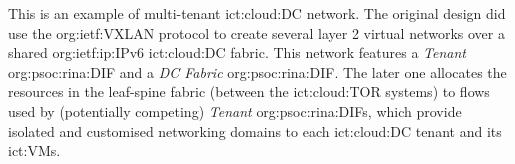 This is an example of multi-tenant \ac{ict:cloud:DC} network.
The original design did use the \acs{org:ietf:VXLAN} protocol to create several layer 2 virtual networks over a shared \acs{org:ietf:ip:IPv6} \ac{ict:cloud:DC} fabric.
This network features a \textit{Tenant} \ac{org:psoc:rina:DIF} and a \textit{DC Fabric} \ac{org:psoc:rina:DIF}.
The later one allocates the resources in the leaf-spine fabric (between the \acs{ict:cloud:TOR} systems) to flows used by (potentially competing) \textit{Tenant} \acp{org:psoc:rina:DIF}, which provide isolated and customised networking domains to each \ac{ict:cloud:DC} tenant and its \acsp{ict:VM}.
